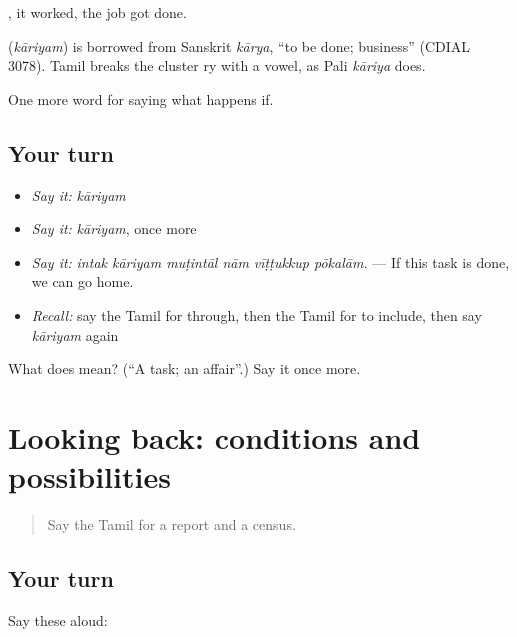  , it worked, the job got done.

\begin{cousinweb}
\textbf{} (\emph{kāriyam}) is borrowed from Sanskrit \emph{kārya}, \textquotedblleft{}to be done; business\textquotedblright{} (CDIAL 3078). Tamil breaks the cluster ry with a vowel, as Pali \emph{kāriya} does.
\end{cousinweb}

\begin{grammarlens}[title={What you've built}]
One more word for saying what happens if.
\end{grammarlens}

\subsection*{Your turn}
\begin{itemize}
\raggedright
  \item \emph{Say it:} \emph{kāriyam}
  \item \emph{Say it:} \emph{kāriyam}, once more
  \item \emph{Say it:} \emph{intak kāriyam muṭintāl nām vīṭṭukkup pōkalām.} — If this task is done, we can go home.
  \item \emph{Recall:} say the Tamil for through, then the Tamil for to include, then say \emph{kāriyam} again
\end{itemize}

\begin{tcolorbox}[breakable,colback=teal!4,colframe=teal!35!black,title={Before you move on}]
What does  mean? (\textquotedblleft{}A task; an affair\textquotedblright{}.) Say it once more.
\end{tcolorbox}
\section[(dialogue)]{Looking back: conditions and possibilities}

\label{lesson:TA-R399-review-393-399}



\begin{quote}
Say the Tamil for a report and a census.
\end{quote}

\subsection*{Your turn}
Say these aloud:

